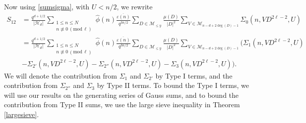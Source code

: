 \documentclass[12pt]{amsart}
\renewcommand{\pmod}[1]{\,(\mathrm{mod}\,#1)}
\begin{document}
Now using \eqref{sumsigma}, with $U<n/2$, we rewrite 
\begin{align}
\label{S12}
S_{12} & =  \frac{q^{d+1/2}}{|\mathcal{H}_d|}  \sum_{\substack{ 1 \leq n\leq N \\ n \not \equiv 0 \pmod \ell}} \widehat{\phi}\left(n\right) \frac{ \overline{\varepsilon(n)}}{q^{3n/2}}\sum_{D \in \mathcal{M}_{\leq y}} \frac{ \mu(D)}{|D|^2}   \sum_{V \in \mathcal{M}_{n-d+2\deg(D)-1}}\Sigma_0(n,VD^{2\ell-2},U) \\
&= \frac{q^{d+1/2}}{|\mathcal{H}_d|}  \sum_{\substack{ 1 \leq n\leq N \\ n \not \equiv 0 \pmod \ell}} \widehat{\phi}\left(n\right) \frac{ \overline{\varepsilon(n)}}{q^{3n/2}}\sum_{D \in \mathcal{M}_{\leq y}} \frac{ \mu(D)}{|D|^2}   \sum_{V \in \mathcal{M}_{n-d+2\deg(D)-1}} \Big( \Sigma_1(n,VD^{2\ell-2},U) \nonumber \\
&-\Sigma_{2'}(n,VD^{2\ell-2},U)-\Sigma_{2''}(n,VD^{2\ell-2},U)-\Sigma_3(n,VD^{2\ell-2},U)\Big) .\nonumber 
\end{align}
We will denote the contribution from $\Sigma_1$ and $\Sigma_{2'}$ by Type I terms, and the contribution from $\Sigma_{2''}$ and $\Sigma_3$ by Type II terms. To bound the Type I terms, we will use our results on the generating series of Gauss sums, and to bound the contribution from Type II sums, we use the large sieve inequality in Theorem \ref{largesieve}.
\end{document}
